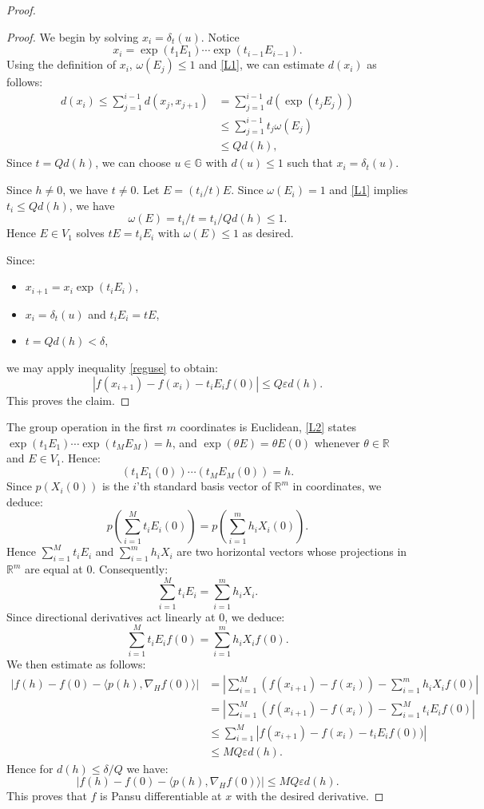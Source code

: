 \documentclass[reqno, 11pt]{amsart}
\theoremstyle{definition}
\theoremstyle{remark}
\numberwithin{theorem}{section}
\numberwithin{equation}{section}
\begin{document}
\begin{proof}
\begin{proof}
We begin by solving $x_{i}=\delta_{t}(u)$. Notice
\[x_{i}=\exp(t_{1}E_{1})\cdots \exp(t_{i-1}E_{i-1}).\]
Using the definition of $x_{i}$, $\omega(E_{j})\leq 1$ and \eqref{L1}, we can estimate $d(x_{i})$ as follows:
\begin{align*}
d(x_{i}) \leq \sum_{j=1}^{i-1}d(x_{j},x_{j+1})&=\sum_{j=1}^{i-1} d(\exp(t_{j}E_{j}))\\
&\leq \sum_{j=1}^{i-1} t_{j}\omega(E_{j})\\
&\leq Qd(h),
\end{align*}
Since $t=Qd(h)$, we can choose $u\in \mathbb{G}$ with $d(u)\leq 1$ such that $x_{i}=\delta_{t}(u)$.

Since $h\neq 0$, we have $t\neq 0$. Let $E=(t_{i}/t)E$. Since $\omega(E_{i})=1$ and \eqref{L1} implies $t_{i}\leq Qd(h)$, we have
\[\omega(E)= t_{i}/t=t_{i}/Qd(h)\leq 1.\]
Hence $E\in V_{1}$ solves $tE=t_{i}E_{i}$ with $\omega(E)\leq 1$ as desired.

Since:
\begin{itemize}
\item $x_{i+1}=x_{i}\exp(t_{i}E_{i})$,
\item $x_{i}=\delta_{t}(u)$ and $t_{i}E_{i}=tE$,
\item $t=Qd(h)<\delta$,
\end{itemize}
we may apply inequality \eqref{reguse} to obtain:
\[|f(x_{i+1})-f(x_{i})-t_{i}E_{i}f(0)|\leq Q\varepsilon d(h).\]
This proves the claim.
\end{proof}

The group operation in the first $m$ coordinates is Euclidean, \eqref{L2} states $\exp(t_{1}E_{1})\cdots \exp(t_{M}E_{M})=h$, and $\exp(\theta E)=\theta E(0)$ whenever $\theta\in \mathbb{R}$ and $E\in V_{1}$. Hence:
\[ (t_{1}E_{1}(0)) \cdots (t_{M}E_{M}(0))=h.\]
Since $p(X_{i}(0))$ is the $i$'th standard basis vector of $\mathbb{R}^{m}$ in coordinates, we deduce:
\[p\left( \sum_{i=1}^{M} t_{i}E_{i}(0) \right) =p\left( \sum_{i=1}^{m} h_{i}X_{i}(0) \right).\]
Hence $\sum_{i=1}^{M} t_{i}E_{i}$ and $\sum_{i=1}^{m} h_{i}X_{i}$ are two horizontal vectors whose projections in $\mathbb{R}^{m}$ are equal at $0$. Consequently:
\[\sum_{i=1}^{M} t_{i}E_{i}=\sum_{i=1}^{m}h_{i}X_{i}.\]
Since directional derivatives act linearly at $0$, we deduce:
\[\sum_{i=1}^{M} t_{i}E_{i}f(0)=\sum_{i=1}^{m}h_{i}X_{i}f(0).\]
We then estimate as follows:
\begin{align*}
|f(h) - f(0) - \langle p(h), \nabla_{H}f(0) \rangle | &= \left|\sum_{i=1}^{M} (f(x_{i+1})-f(x_{i})) - \sum_{i=1}^{m} h_{i}X_{i}f(0)\right|  \\
&= \left|\sum_{i=1}^{M} (f(x_{i+1})-f(x_{i})) - \sum_{i=1}^{M} t_{i}E_{i}f(0)\right| \\
&\leq \sum_{i=1}^{M} |f(x_{i+1})-f(x_{i}) - t_{i}E_{i}f(0)) |\\
&\leq MQ \varepsilon d(h).
\end{align*}
Hence for $d(h)\leq \delta/Q$ we have:
\[|f(h) - f(0) - \langle p(h), \nabla_{H}f(0) \rangle |\leq MQ\varepsilon d(h).\]
This proves that $f$ is Pansu differentiable at $x$ with the desired derivative. 
\end{proof}
\end{document}

